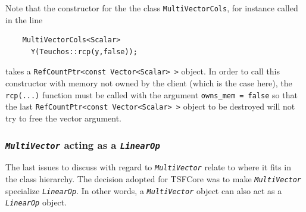 {}\noindent{}Note that the constructor for the the class \texttt{MultiVectorCols},
for instance called in the line

{\scriptsize\begin{verbatim}
    MultiVectorCols<Scalar>
      Y(Teuchos::rcp(y,false));
\end{verbatim}}

{}\noindent{}takes a \texttt{RefCountPtr<const Vector<Scalar> >} object.  In
order to call this constructor with memory not owned by the client
(which is the case here), the \texttt{rcp(...)} function must be
called with the argument \texttt{owns\_mem = false} so that the last
\texttt{RefCountPtr<const Vector<Scalar> >} object to be destroyed
will not try to free the vector argument.

%
\subsubsection{\texttt{\textit{Multi\-Vector}} acting as a \texttt{\textit{LinearOp}}}
\label{tsfcore:sec:multi_vec_linear_op}
%

The last issues to discuss with regard to
\texttt{\textit{Multi\-Vector}} relate to where it fits in the class
hierarchy.  The decision adopted for TSFCore was to make
\texttt{\textit{Multi\-Vector}} specialize \texttt{\textit{LinearOp}}.
In other words, a \texttt{\textit{Multi\-Vector}} object can also act as
a \texttt{\textit{LinearOp}} object.

